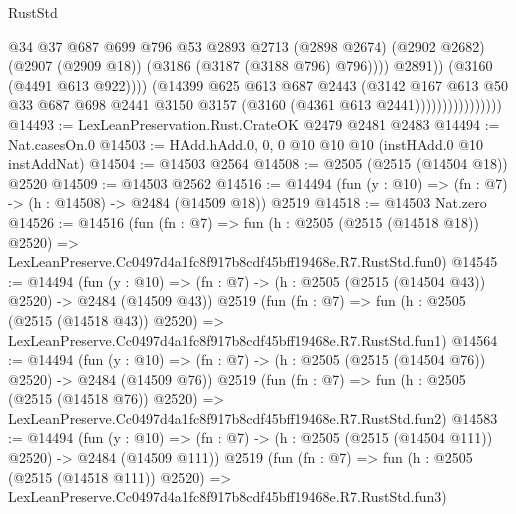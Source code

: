\begin{lexlean}{RustStd}
\begin{coremodule}
                                        @34
                                        @37
                                        @687
                                        @699
                                        @796
                                        @53
                                        @2893
                                        @2713
                                        (@2898 @2674)
                                        (@2902 @2682)
                                        (@2907 (@2909 @18))
                                        (@3186 (@3187 (@3188 @796) @796))))
                                    @2891))
                                (@3160 (@4491 @613 @922))))
                            (@14399
                              @625
                              @613
                              @687
                              @2443
                              (@3142
                                @167
                                @613
                                @50
                                @33
                                @687
                                @698
                                @2441
                                @3150
                                @3157
                                (@3160 (@4361 @613 @2441))))))))))))))))
@14493 := LexLeanPreservation.Rust.CrateOK @2479 @2481 @2483
@14494 := Nat.casesOn.{0}
@14503 := HAdd.hAdd.{0, 0, 0} @10 @10 @10 (instHAdd.{0} @10 instAddNat)
@14504 := @14503 @2564
@14508 := @2505 (@2515 (@14504 @18)) @2520
@14509 := @14503 @2562
@14516 := @14494 (fun (y : @10) => (fn : @7) -> (h : @14508) -> @2484 (@14509 @18)) @2519
@14518 := @14503 Nat.zero
@14526 := @14516
    (fun (fn : @7) =>
    fun (h : @2505 (@2515 (@14518 @18)) @2520) =>
    LexLeanPreserve.Cc0497d4a1fc8f917b8cdf45bff19468e.R7.RustStd.fun0)
@14545 := @14494
    (fun (y : @10) => (fn : @7) -> (h : @2505 (@2515 (@14504 @43)) @2520) -> @2484 (@14509 @43))
    @2519
    (fun (fn : @7) =>
    fun (h : @2505 (@2515 (@14518 @43)) @2520) =>
    LexLeanPreserve.Cc0497d4a1fc8f917b8cdf45bff19468e.R7.RustStd.fun1)
@14564 := @14494
    (fun (y : @10) => (fn : @7) -> (h : @2505 (@2515 (@14504 @76)) @2520) -> @2484 (@14509 @76))
    @2519
    (fun (fn : @7) =>
    fun (h : @2505 (@2515 (@14518 @76)) @2520) =>
    LexLeanPreserve.Cc0497d4a1fc8f917b8cdf45bff19468e.R7.RustStd.fun2)
@14583 := @14494
    (fun (y : @10) => (fn : @7) -> (h : @2505 (@2515 (@14504 @111)) @2520) -> @2484 (@14509 @111))
    @2519
    (fun (fn : @7) =>
    fun (h : @2505 (@2515 (@14518 @111)) @2520) =>
    LexLeanPreserve.Cc0497d4a1fc8f917b8cdf45bff19468e.R7.RustStd.fun3)

\end{coremodule}
\end{lexlean}
